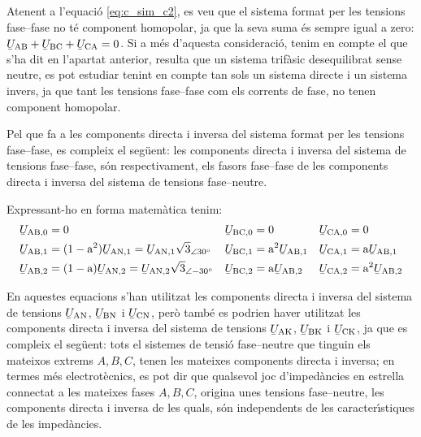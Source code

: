 \begin{center}
    
    \label{pic:Comp_sim_tens}
\end{center}

Atenent a l'equaci\'{o} \eqref{eq:c_sim_c2}, es veu que el sistema
format per les tensions fase--fase no t\'{e} component homopolar, ja que
la seva suma  \'{e}s sempre igual a zero: $\cmplx{U}\ped{AB} +
\cmplx{U}\ped{BC} + \cmplx{U}\ped{CA} = 0$. Si a m\'{e}s
d'aquesta consideraci\'{o}, tenim en compte el que s'ha dit en l'apartat
anterior, resulta que un sistema trif\`{a}sic desequilibrat sense
neutre, es pot estudiar tenint en compte tan sols un sistema directe
i un sistema invers, ja que tant les tensions fase--fase com els
corrents de fase, no tenen component homopolar.

Pel que fa a les components directa i inversa del sistema format per
les tensions fase--fase, es compleix el seg\"{u}ent: les components
directa i inversa del sistema de tensions fase--fase, s\'{o}n
respectivament, els fasors fase--fase de les components directa i
inversa del sistema de tensions fase--neutre.

Expressant-ho en forma matem\`{a}tica tenim:
\begin{subequations}
\begin{align}
   \cmplx{U}\ped{AB,0} &= 0 &
   \cmplx{U}\ped{BC,0} &= 0 &
   \cmplx{U}\ped{CA,0} &= 0 \\
   \cmplx{U}\ped{AB,1} &= (1-\au^2) \cmplx{U}\ped{AN,1} =
   \cmplx{U}\ped{AN,1} \sqrt{3}_{\angle 30\degree} &
   \cmplx{U}\ped{BC,1} &= \au^2 \cmplx{U}\ped{AB,1} &
   \cmplx{U}\ped{CA,1} &= \au \cmplx{U}\ped{AB,1} \label{eq:c_sim_a3} \\
   \cmplx{U}\ped{AB,2} &= (1-\au) \cmplx{U}\ped{AN,2}  =
   \cmplx{U}\ped{AN,2} \sqrt{3}_{\angle -30\degree}&
   \cmplx{U}\ped{BC,2} &= \au \cmplx{U}\ped{AB,2} &
   \cmplx{U}\ped{CA,2} &= \au^2 \cmplx{U}\ped{AB,2} \label{eq:c_sim_b3}
\end{align}
\end{subequations}

En aquestes equacions s'han utilitzat les components directa i
inversa del sistema de tensions
$\cmplx{U}\ped{AN}$, $\cmplx{U}\ped{BN}$ i $\cmplx{U}\ped{CN}$,
per\`{o} tamb\'{e} es podrien haver utilitzat les components directa i
inversa del sistema de tensions
$\cmplx{U}\ped{AK}$, $\cmplx{U}\ped{BK}$ i $\cmplx{U}\ped{CK}$,
ja que es compleix el seg\"{u}ent: tots el sistemes de tensi\'{o}
fase--neutre que tinguin els mateixos extrems $A, B,
C$, tenen les mateixes components directa i inversa; en termes
m\'{e}s electrot\`{e}cnics, es pot dir que qualsevol joc d'imped\`{a}ncies en
estrella connectat a les mateixes fases $A, B, C$,
origina unes tensions fase--neutre, les components directa i inversa
de les quals, s\'{o}n independents de les caracter\'{\i}stiques de les
imped\`{a}ncies.

